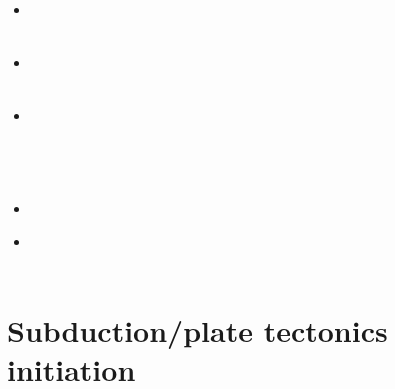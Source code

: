 \begin{scriptsize}
\begin{itemize}
\textcite{bomv15} \\
\textcite{nani15} \\
\item[\twothousandseventeen] 
\textcite{ceww17} \\
\textcite{wewv17} \\
\item[\twothousandeighteen] 
\textcite{fade18} \\
\textcite{wakc18b} \\
\item[\twothousandnineteen] 
\textcite{ceww19} \\ 
\textcite{meag19} \\
\textcite{ligc19} \\
\textcite{prdp19} \\
\item[\twothousandtwentyone] 
\textcite{lesc21} \\
\item[\twothousandtwentytwo] 
\textcite{li22} \\
\textcite{ceap22} \\
\end{itemize}
\end{scriptsize}

\section{Subduction/plate tectonics initiation}


